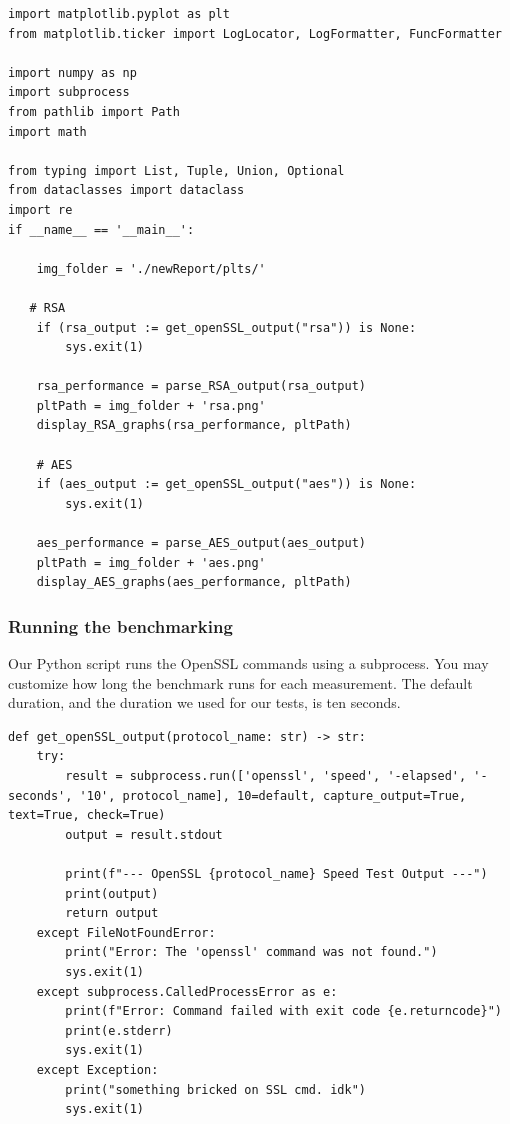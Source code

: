 \documentclass[11pt]{article}
\begin{document}
\begin{lstlisting}
import matplotlib.pyplot as plt
from matplotlib.ticker import LogLocator, LogFormatter, FuncFormatter

import numpy as np
import subprocess
from pathlib import Path
import math

from typing import List, Tuple, Union, Optional
from dataclasses import dataclass
import re
if __name__ == '__main__':
    
    img_folder = './newReport/plts/'

   # RSA
    if (rsa_output := get_openSSL_output("rsa")) is None:
        sys.exit(1)

    rsa_performance = parse_RSA_output(rsa_output)
    pltPath = img_folder + 'rsa.png'
    display_RSA_graphs(rsa_performance, pltPath)

    # AES
    if (aes_output := get_openSSL_output("aes")) is None:
        sys.exit(1)

    aes_performance = parse_AES_output(aes_output)
    pltPath = img_folder + 'aes.png'
    display_AES_graphs(aes_performance, pltPath) 
\end{lstlisting}

\subsubsection*{Running the benchmarking}

Our Python script runs the OpenSSL commands using a subprocess. You may customize how long the benchmark runs for each measurement. The default duration, and the duration we used for our tests, is ten seconds.

\begin{lstlisting}
def get_openSSL_output(protocol_name: str) -> str:
    try:
        result = subprocess.run(['openssl', 'speed', '-elapsed', '-seconds', '10', protocol_name], 10=default, capture_output=True, text=True, check=True)
        output = result.stdout
        
        print(f"--- OpenSSL {protocol_name} Speed Test Output ---")
        print(output)
        return output
    except FileNotFoundError:
        print("Error: The 'openssl' command was not found.")
        sys.exit(1)
    except subprocess.CalledProcessError as e:
        print(f"Error: Command failed with exit code {e.returncode}")
        print(e.stderr)
        sys.exit(1)
    except Exception:
        print("something bricked on SSL cmd. idk")
        sys.exit(1)
\end{lstlisting}
\end{document}
